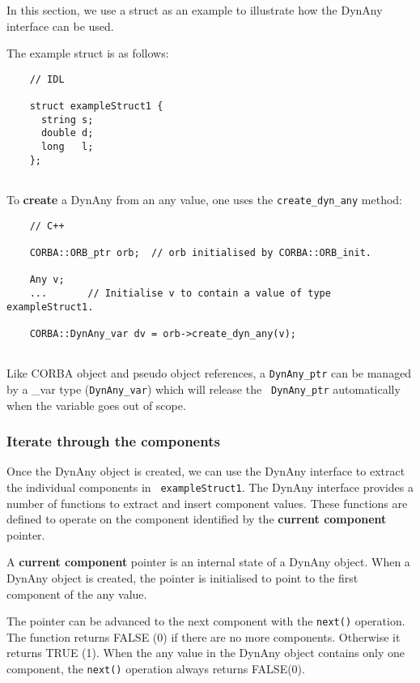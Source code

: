 \documentclass[11pt,twoside,onecolumn]{book}
\begin{document}
In this section, we use a struct as an example to illustrate how the DynAny
interface can be used.

The example struct is as follows:

{\small
\begin{verbatim}
    // IDL
    
    struct exampleStruct1 {
      string s;
      double d;
      long   l;
    };
    
\end{verbatim}
}

To {\bf create} a DynAny from an any value, one uses the {\tt create\_dyn\_any}
method:

{\small
\begin{verbatim}
    // C++
    
    CORBA::ORB_ptr orb;  // orb initialised by CORBA::ORB_init.
    
    Any v;
    ...       // Initialise v to contain a value of type exampleStruct1.
    
    CORBA::DynAny_var dv = orb->create_dyn_any(v);
    
\end{verbatim}
}

Like CORBA object and pseudo object references, a {\tt DynAny\_ptr} can be
managed by a \_var type ({\tt DynAny\_var}) which will release the {\tt
DynAny\_ptr} automatically when the variable goes out of scope.

\subsubsection{Iterate through the components}
\label{dynanyiterate}

Once the DynAny object is created, we can use the
DynAny interface to extract the individual components in {\tt
exampleStruct1}. The DynAny interface provides a number of
functions to extract and insert component values. These functions are
defined to operate on the component identified by the {\bf current
component} pointer. 

A {\bf current component} pointer is an internal state of a DynAny object.  
When a DynAny object is created, the pointer is initialised to point to the
first component of the any value. 

The pointer can be advanced to the next component with the {\tt next()}
operation. The function returns FALSE (0) if there are no more components.
Otherwise it returns TRUE (1). When the any value in the DynAny object
contains only one component, the {\tt next()} operation always returns
FALSE(0).
\end{document}
